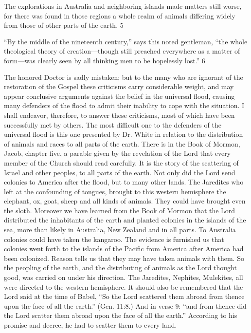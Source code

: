 The explorations in Australia and neighboring islands made matters still worse, for there was
found in those regions a whole realm of animals differing widely from those of other parts of
the earth. 5

``By the middle of the nineteenth century,'' says this noted gentleman, ``the whole theological
theory of creation—though still preached everywhere as a matter of form—was clearly seen
by all thinking men to be hopelessly lost.'' 6

The honored Doctor is sadly mistaken; but to the many who are ignorant of the restoration of
the Gospel these criticisms carry considerable weight, and may appear conclusive arguments
against the belief in the universal flood, causing many defenders of the flood to admit their
inability to cope with the situation. I shall endeavor, therefore, to answer these criticisms,
most of which have been successfully met by others. The most difficult one to the defenders
of the universal flood is this one presented by Dr. White in relation to the distribution of
animals and races to all parts of the earth. There is in the Book of Mormon, Jacob, chapter
five, a parable given by the revelation of the Lord that every member of the Church should
read carefully. It is the story of the scattering of Israel and other peoples, to all parts of the
earth. Not only did the Lord send colonies to America after the flood, but to many other
lands. The Jaredites who left at the confounding of tongues, brought to this western
hemisphere the elephant, ox, goat, sheep and all kinds of animals. They could have brought
even the sloth. Moreover we have learned from the Book of Mormon that the Lord
distributed the inhabitants of the earth and planted colonies in the islands of the sea, more
than likely in Australia, New Zealand and in all parts. To Australia colonies could have taken
the kangaroo. The evidence is furnished us that colonies went forth to the islands of the
Pacific from America after America had been colonized. Reason tells us that they may have
taken animals with them. So the peopling of the earth, and the distributing of animals as the
Lord thought good, was carried on under his direction. The Jaredites, Nephites, Mulekites, all
were directed to the western hemisphere. It should also be remembered that the Lord said at
the time of Babel, ``So the Lord scattered them abroad from thence upon the face of all the
earth.'' (Gen. 11:8.) And in verse 9: ``and from thence did the Lord scatter them abroad upon
the face of all the earth.'' According to his promise and decree, he had to scatter them to
every land.

